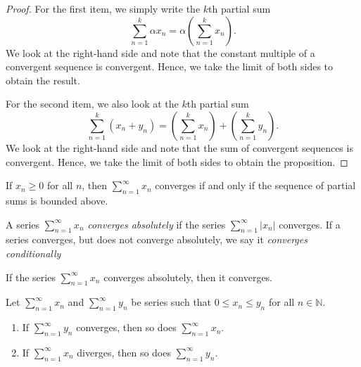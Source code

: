 \documentclass[../main.tex]{subfiles}
\begin{document}
    \begin{proof}
        
    For the first item, we simply write the $k$th partial sum
    \[
    \sum_{n=1}^{k} \alpha x_n = \alpha \left( \sum_{n=1}^{k} x_n \right).
    \]
    We look at the right-hand side and note that the constant multiple of a convergent sequence is convergent. Hence, we take the limit of both sides to obtain the result.
    
    For the second item, we also look at the $k$th partial sum
    \[
    \sum_{n=1}^{k} (x_n + y_n) = \left( \sum_{n=1}^{k} x_n \right) + \left( \sum_{n=1}^{k} y_n \right).
    \]
    We look at the right-hand side and note that the sum of convergent sequences is convergent. Hence, we take the limit of both sides to obtain the proposition.   
    \end{proof}
    
    
    
    \begin{proposition}
    If $x_n \geq 0$ for all $n$, then $\sum_{n=1}^{\infty} x_n$ converges if and only if the sequence of partial sums is bounded above.
    \end{proposition}
    
    
    
    
    
    \begin{definition}\label{def:absolute_Convergence_series}
    A series $\sum_{n=1}^{\infty} x_n$ \textit{converges absolutely} if the series $\sum_{n=1}^{\infty} |x_n|$ converges. If a series converges, but does not converge absolutely, we say it \textit{converges conditionally}
    \end{definition}
    
    
    
    
    \begin{proposition}
    If the series $\sum_{n=1}^{\infty} x_n$ converges absolutely, then it converges.
    \end{proposition}
    
    
    
    
    
    \begin{proposition}\label{prp:comparison_test_series}
    Let $\sum_{n=1}^{\infty} x_n$ and $\sum_{n=1}^{\infty} y_n$ be series such that $0 \leq x_n \leq y_n$ for all $n \in \mathbb{N}$.
    \begin{enumerate}
        \item If $\sum_{n=1}^{\infty} y_n$ converges, then so does $\sum_{n=1}^{\infty} x_n$.
        \item If $\sum_{n=1}^{\infty} x_n$ diverges, then so does $\sum_{n=1}^{\infty} y_n$.
    \end{enumerate}
    \end{proposition}
    
\end{document}
